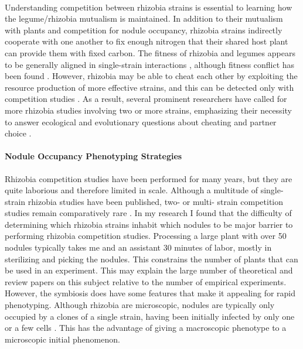 \documentclass[12pt]{article}
\begin{document}
\begin{doublespace}
\paragraph{} 
Understanding competition between rhizobia strains is essential to learning how the \linebreak 
legume/rhizobia mutualism is maintained. In addition to their mutualism with plants and competition for nodule occupancy, rhizobia strains indirectly cooperate with one another to fix enough nitrogen that their shared host plant can provide them with fixed carbon. The fitness of rhizobia and legumes appears to be generally aligned in single-strain interactions \cite{Friesen2012}, although fitness conflict has been found \cite{Porter2014}. However, rhizobia may be able to cheat each other by exploiting the resource production of more effective strains, and this can be detected only with competition studies \cite{Ratcliff2009}. As a result, several prominent researchers have called for more rhizobia studies involving two or more strains, emphasizing their necessity to answer ecological and evolutionary questions about cheating and partner choice \cite{Kiers2013,Friesen2012}. 

\paragraph{Nodule Occupancy Phenotyping Strategies} 
Rhizobia competition studies have been performed for many years, but they are quite laborious and therefore limited in scale. Although a multitude of single-strain rhizobia studies have been published, two- or multi- strain competition studies remain comparatively rare \cite{Friesen2012}. In my research I found that the difficulty of determining which rhizobia strains inhabit which nodules to be major barrier to performing rhizobia competition studies. Processing a large plant with over 50 nodules typically takes me and an assistant 30 minutes of labor, mostly in sterilizing and picking the nodules. This constrains the number of plants that can be used in an experiment. This may explain the large number of theoretical and review papers on this subject relative to the number of empirical experiments. However, the symbiosis does have some features that make it appealing for rapid phenotyping. Although rhizobia are microscopic, nodules are typically only occupied by a clones of a single strain, having been initially infected by only one or a few cells \cite{Denison2000}. This has the advantage of giving a macroscopic phenotype to a microscopic initial phenomenon.


\end{doublespace}
\end{document}
